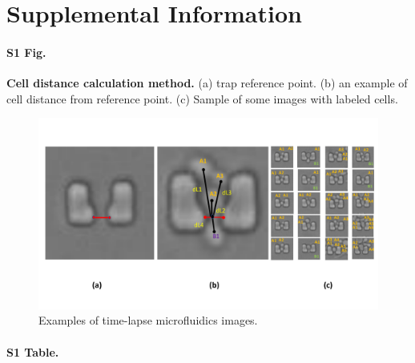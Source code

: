 \documentclass[conference]{IEEEtran}
\begin{document}




\section{Supplemental Information}

\paragraph*{S1 Fig.}
\label{S1_Fig}
{\bf  Cell distance calculation method.} (a) trap reference point. (b) an example of cell distance from reference point. (c) Sample of some images with labeled cells. 


\begin{figure}
\centering
\includegraphics[width=\textwidth,height=10 cm]{Patterns/point.pdf}
\caption{ Examples of time-lapse microfluidics images.}
\label{fig:imageData}
\end{figure} 



\paragraph*{S1 Table.}
\end{document}
